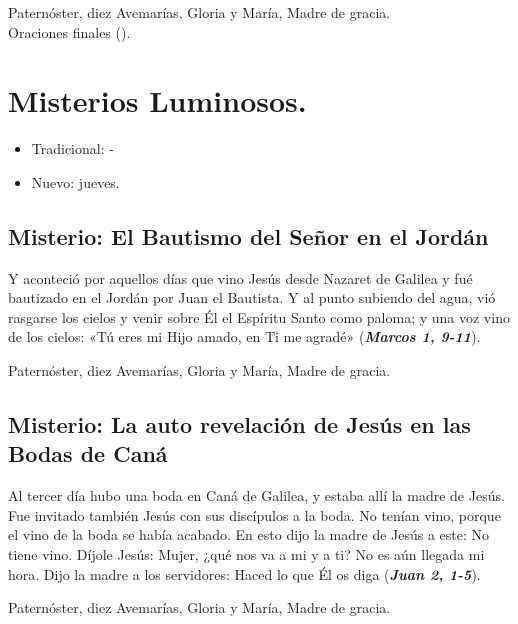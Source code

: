 \documentclass[./main.tex]{subfiles}
\newcounter{lux-counter}
\begin{document}
\begin{center}
      Paternóster, diez Avemarías, Gloria y María, Madre de gracia.\\
      Oraciones finales ().
\end{center}

\section*{Misterios Luminosos.}
\begin{itemize}
      \item Tradicional: -
      \item Nuevo: jueves.
\end{itemize}

\subsection*{ Misterio: El Bautismo del Señor en el Jordán}
Y aconteció por aquellos días que vino Jesús desde Nazaret de Galilea y fué bautizado en el Jordán por Juan el Bautista. 
Y al punto subiendo del agua, vió rasgarse los cielos y venir sobre Él el Espíritu Santo como paloma; 
y una voz vino de los cielos: «Tú eres mi Hijo amado, en Ti me agradé» (\textbf{\emph{Marcos 1, 9-11}}).

\begin{center}
      Paternóster, diez Avemarías, Gloria y María, Madre de gracia.
\end{center}

\subsection*{ Misterio: La auto revelación de Jesús en las Bodas de Caná}
Al tercer día hubo una boda en Caná de Galilea, y estaba allí la madre de Jesús. Fue invitado también Jesús con sus discípulos a la boda. 
No tenían vino, porque el vino de la boda se había acabado. En esto dijo la madre de Jesús a este: No tiene vino. 
Díjole Jesús: Mujer, ¿qué nos va a mi y a ti? No es aún llegada mi hora. Dijo la madre a los servidores: Haced lo que Él os diga (\textbf{\emph{Juan 2, 1-5}}).

\begin{center}
      Paternóster, diez Avemarías, Gloria y María, Madre de gracia.
\end{center}
\end{document}
